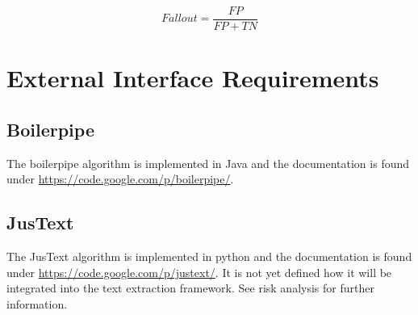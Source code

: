 \begin{equation}
Fallout = \frac{FP}{FP + TN}
\end{equation}




\section{External Interface Requirements}

\subsection{Boilerpipe}

The boilerpipe algorithm is implemented in Java and the documentation is found under
\url{https://code.google.com/p/boilerpipe/}.

\subsection{JusText}

The JusText algorithm is implemented in python and the documentation is found under \url{https://code.google.com/p/justext/}. It is not yet defined how it will be integrated into the text extraction framework. See risk analysis for further information.


